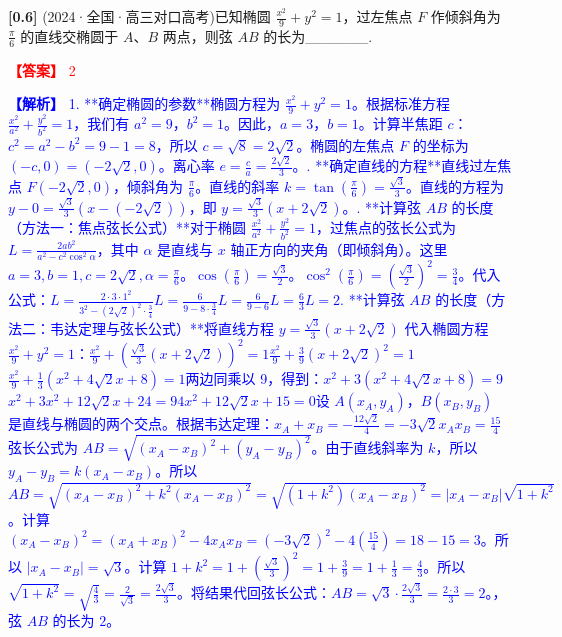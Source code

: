 \documentclass[varwidth=16cm, border=2mm]{standalone}
\begin{document}
\textbf{[0.6]} (2024·全国·高三对口高考)已知椭圆 $\frac{x^2}{9} + y^2 = 1$，过左焦点 $F$ 作倾斜角为 $\frac{\pi}{6}$ 的直线交椭圆于 $A$、$B$ 两点，则弦 $AB$ 的长为______.

\vspace{0.2cm}\par\noindent\textcolor{red}{\textbf{【答案】} 2}
\par\noindent\textcolor{blue}{\textbf{【解析】} 1. **确定椭圆的参数**\n   椭圆方程为 $\frac{x^2}{9} + y^2 = 1$。\n   根据标准方程 $\frac{x^2}{a^2} + \frac{y^2}{b^2} = 1$，我们有 $a^2 = 9$，$b^2 = 1$。\n   因此，$a = 3$，$b = 1$。\n   计算半焦距 $c$：$c^2 = a^2 - b^2 = 9 - 1 = 8$，所以 $c = \sqrt{8} = 2\sqrt{2}$。\n   椭圆的左焦点 $F$ 的坐标为 $(-c, 0) = (-2\sqrt{2}, 0)$。\n   离心率 $e = \frac{c}{a} = \frac{2\sqrt{2}}{3}$。\n{}. **确定直线的方程**\n   直线过左焦点 $F(-2\sqrt{2}, 0)$，倾斜角为 $\frac{\pi}{6}$。\n   直线的斜率 $k = \tan(\frac{\pi}{6}) = \frac{\sqrt{3}}{3}$。\n   直线的方程为 $y - 0 = \frac{\sqrt{3}}{3} (x - (-2\sqrt{2}))$，即 $y = \frac{\sqrt{3}}{3} (x + 2\sqrt{2})$。\n{}. **计算弦 $AB$ 的长度（方法一：焦点弦长公式）**\n   对于椭圆 $\frac{x^2}{a^2} + \frac{y^2}{b^2} = 1$，过焦点的弦长公式为 $L = \frac{2ab^2}{a^2 - c^2\cos^2\alpha}$，其中 $\alpha$ 是直线与 $x$ 轴正方向的夹角（即倾斜角）。\n   这里 $a=3, b=1, c=2\sqrt{2}, \alpha = \frac{\pi}{6}$。\n   $\cos(\frac{\pi}{6}) = \frac{\sqrt{3}}{2}$。\n   $\cos^2(\frac{\pi}{6}) = (\frac{\sqrt{3}}{2})^2 = \frac{3}{4}$。\n   代入公式：\n   $L = \frac{2 \cdot 3 \cdot 1^2}{3^2 - (2\sqrt{2})^2 \cdot \frac{3}{4}}$\n   $L = \frac{6}{9 - 8 \cdot \frac{3}{4}}$\n   $L = \frac{6}{9 - 6}$\n   $L = \frac{6}{3}$\n   $L = 2$\n{}. **计算弦 $AB$ 的长度（方法二：韦达定理与弦长公式）**\n   将直线方程 $y = \frac{\sqrt{3}}{3} (x + 2\sqrt{2})$ 代入椭圆方程 $\frac{x^2}{9} + y^2 = 1$：\n   $\frac{x^2}{9} + (\frac{\sqrt{3}}{3} (x + 2\sqrt{2}))^2 = 1$\n   $\frac{x^2}{9} + \frac{3}{9} (x + 2\sqrt{2})^2 = 1$\n   $\frac{x^2}{9} + \frac{1}{3} (x^2 + 4\sqrt{2}x + 8) = 1$\n   两边同乘以 9，得到：\n   $x^2 + 3(x^2 + 4\sqrt{2}x + 8) = 9$\n   $x^2 + 3x^2 + 12\sqrt{2}x + 24 = 9$\n   $4x^2 + 12\sqrt{2}x + 15 = 0$\n   设 $A(x_A, y_A)$，$B(x_B, y_B)$ 是直线与椭圆的两个交点。\n   根据韦达定理：\n   $x_A + x_B = -\frac{12\sqrt{2}}{4} = -3\sqrt{2}$\n   $x_A x_B = \frac{15}{4}$\n   弦长公式为 $AB = \sqrt{(x_A - x_B)^2 + (y_A - y_B)^2}$。\n   由于直线斜率为 $k$，所以 $y_A - y_B = k(x_A - x_B)$。\n   所以 $AB = \sqrt{(x_A - x_B)^2 + k^2(x_A - x_B)^2} = \sqrt{(1+k^2)(x_A - x_B)^2} = |x_A - x_B|\sqrt{1+k^2}$。\n   计算 $(x_A - x_B)^2 = (x_A + x_B)^2 - 4x_A x_B = (-3\sqrt{2})^2 - 4(\frac{15}{4}) = 18 - 15 = 3$。\n   所以 $|x_A - x_B| = \sqrt{3}$。\n   计算 $1+k^2 = 1 + (\frac{\sqrt{3}}{3})^2 = 1 + \frac{3}{9} = 1 + \frac{1}{3} = \frac{4}{3}$。\n   所以 $\sqrt{1+k^2} = \sqrt{\frac{4}{3}} = \frac{2}{\sqrt{3}} = \frac{2\sqrt{3}}{3}$。\n   将结果代回弦长公式：\n   $AB = \sqrt{3} \cdot \frac{2\sqrt{3}}{3} = \frac{2 \cdot 3}{3} = 2$。\n{}，弦 $AB$ 的长为 $2$。}
\end{document}
